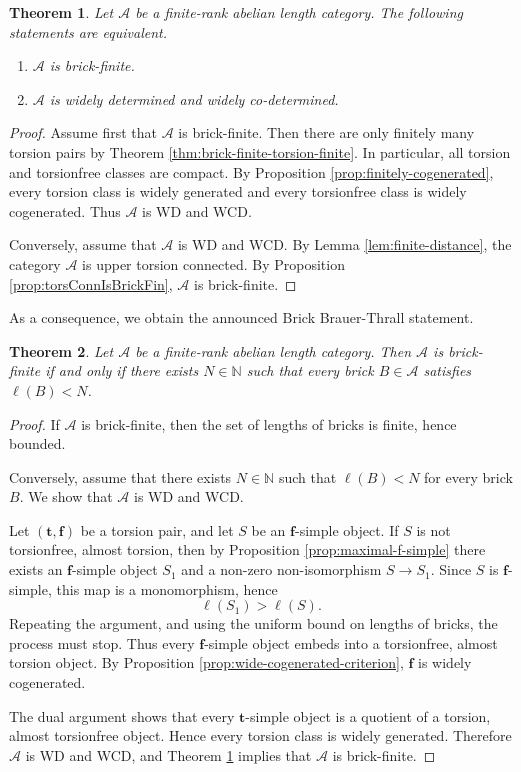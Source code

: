 \documentclass[11pt]{amsart}
\newtheorem{theorem}{Theorem}[section]
\theoremstyle{definition}
\newcommand{\A}{\mathcal A}
\newcommand{\elll}{\ell}
\begin{document}
\begin{theorem}\label{thm:main}
Let \(\A\) be a finite-rank abelian length category. The following statements are equivalent.
\begin{enumerate}[label=\textup{(\arabic*)},leftmargin=2.5em]
\item \(\A\) is brick-finite.
\item \(\A\) is widely determined and widely co-determined.
\end{enumerate}
\end{theorem}

\begin{proof}
Assume first that \(\A\) is brick-finite. Then there are only finitely many torsion pairs by Theorem \ref{thm:brick-finite-torsion-finite}. In particular, all torsion and torsionfree classes are compact. By Proposition \ref{prop:finitely-cogenerated}, every torsion class is widely generated and every torsionfree class is widely cogenerated. Thus \(\A\) is WD and WCD.

Conversely, assume that \(\A\) is WD and WCD. By Lemma \ref{lem:finite-distance}, the category \( \A \) is upper torsion connected. By Proposition \ref{prop:torsConnIsBrickFin}, \( \A \) is brick-finite.
\end{proof}

As a consequence, we obtain the announced Brick Brauer-Thrall statement.

\begin{theorem}\label{thm:bounded-length}
Let \(\A\) be a finite-rank abelian length category. Then \(\A\) is brick-finite if and only if there exists \(N\in\mathbb N\) such that every brick \(B\in\A\) satisfies \(\elll(B)<N\).
\end{theorem}

\begin{proof}
If \(\A\) is brick-finite, then the set of lengths of bricks is finite, hence bounded.

Conversely, assume that there exists \(N\in\mathbb N\) such that \(\elll(B)<N\) for every brick \(B\). We show that \(\A\) is WD and WCD.

Let \((\mathbf t,\mathbf f)\) be a torsion pair, and let \(S\) be an \(\mathbf f\)-simple object. If \(S\) is not torsionfree, almost torsion, then by Proposition \ref{prop:maximal-f-simple} there exists an \(\mathbf f\)-simple object \(S_1\) and a non-zero non-isomorphism \(S\to S_1\). Since \(S\) is \(\mathbf f\)-simple, this map is a monomorphism, hence
\[
\elll(S_1)>\elll(S).
\]
Repeating the argument, and using the uniform bound on lengths of bricks, the process must stop. Thus every \(\mathbf f\)-simple object embeds into a torsionfree, almost torsion object. By Proposition \ref{prop:wide-cogenerated-criterion}, \(\mathbf f\) is widely cogenerated.

The dual argument shows that every \(\mathbf t\)-simple object is a quotient of a torsion, almost torsionfree object. Hence every torsion class is widely generated. Therefore \(\A\) is WD and WCD, and Theorem \ref{thm:main} implies that \(\A\) is brick-finite.
\end{proof}
\end{document}
